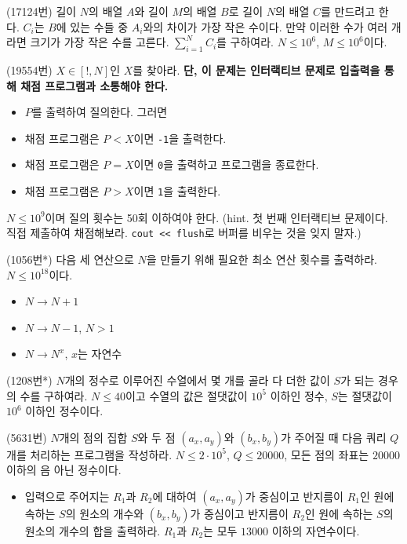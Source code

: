 \begin{problem}
    (17124번) 길이 $N$의 배열 $A$와 길이 $M$의 배열 $B$로 길이 $N$의 배열 $C$를 만드려고 한다. $C_i$는 $B$에 있는 수들 중 $A_i$와의 차이가 가장 작은 수이다. 만약 이러한 수가 여러 개라면 크기가 가장 작은 수를 고른다. $\sum_{i=1}^N C_i$를 구하여라. $N \leq 10^6$, $M \leq 10^6$이다.
\end{problem}

\begin{problem}
    (19554번) $X \in [!, N]$인 $X$를 찾아라. \textbf{단, 이 문제는 인터랙티브 문제로 입출력을 통해 채점 프로그램과 소통해야 한다.}
    \begin{itemize}
        \item $P$를 출력하여 질의한다. 그러면
        \item 채점 프로그램은 $P < X$이면 \texttt{-1}을 출력한다.
        \item 채점 프로그램은 $P = X$이면 \texttt{0}을 출력하고 프로그램을 종료한다.
        \item 채점 프로그램은 $P > X$이면 \texttt{1}을 출력한다.
    \end{itemize}
    $N \leq 10^9$이며 질의 횟수는 50회 이하여야 한다. (hint. 첫 번째 인터랙티브 문제이다. 직접 제출하여 채점해보라. \texttt{cout << flush}로 버퍼를 비우는 것을 잊지 말자.)
\end{problem}

\begin{problem}
    (1056번*) 다음 세 연산으로 $N$을 만들기 위해 필요한 최소 연산 횟수를 출력하라. $N \leq 10^{18}$이다.
    \begin{itemize}
        \item $N \rightarrow N+1$
        \item $N \rightarrow N-1$, $N > 1$
        \item $N \rightarrow N^x$, $x$는 자연수
    \end{itemize}
\end{problem}

\begin{problem}
    (1208번*) $N$개의 정수로 이루어진 수열에서 몇 개를 골라 다 더한 값이 $S$가 되는 경우의 수를 구하여라. $N \leq 40$이고 수열의 값은 절댓값이 $10^5$ 이하인 정수, $S$는 절댓값이 $10^6$ 이하인 정수이다.
\end{problem}

\begin{problem}
    (5631번) $N$개의 점의 집합 $S$와 두 점 $(a_x, a_y)$와 $(b_x, b_y)$가 주어질 때 다음 쿼리 $Q$개를 처리하는 프로그램을 작성하라. $N \leq 2 \cdot 10^5$, $Q \leq 20000$, 모든 점의 좌표는 $20000$ 이하의 음 아닌 정수이다.
    \begin{itemize}
        \item 입력으로 주어지는 $R_1$과 $R_2$에 대하여 $(a_x, a_y)$가 중심이고 반지름이 $R_1$인 원에 속하는 $S$의 원소의 개수와 $(b_x, b_y)$가 중심이고 반지름이 $R_2$인 원에 속하는 $S$의 원소의 개수의 합을 출력하라. $R_1$과 $R_2$는 모두 $13000$ 이하의 자연수이다.
    \end{itemize}
\end{problem}

